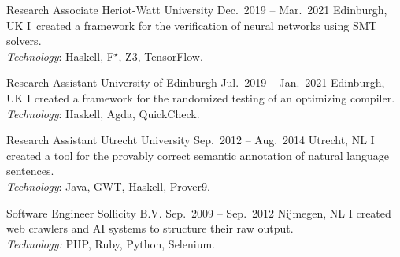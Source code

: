 \cvevent
{Research Associate}
{Heriot-Watt University}
{Dec.\ 2019 -- Mar.\ 2021}
{Edinburgh, UK}
I created a framework for the verification of neural networks using SMT solvers.\\
\emph{Technology}: Haskell, F$^\star$, Z3, TensorFlow.

\divider

\cvevent
{Research Assistant}
{University of Edinburgh}
{Jul.\ 2019 -- Jan.\ 2021}
{Edinburgh, UK}
I created a framework for the randomized testing of an optimizing compiler.\\
\emph{Technology}: Haskell, Agda, QuickCheck.

\divider

\cvevent
{Research Assistant}
{Utrecht University}
{Sep.\ 2012 -- Aug.\ 2014}
{Utrecht, NL}
I created a tool for the provably correct semantic annotation of natural language sentences.\\
\emph{Technology}: Java, GWT, Haskell, Prover9.



\divider

\cvevent
{Software Engineer}
{Sollicity B.V.}
{Sep.\ 2009 -- Sep.\ 2012}
{Nijmegen, NL}
I created web crawlers and AI systems to structure their raw output.\\
\emph{Technology:} PHP, Ruby, Python, Selenium.

